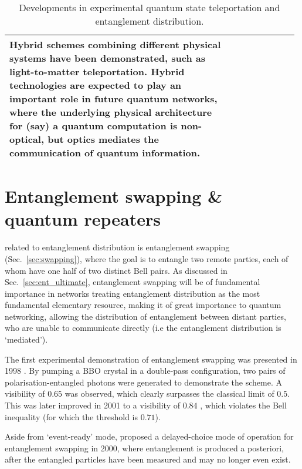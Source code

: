 \begin{table*}[!htbp]
\begin{tabular}{|p{0.755\linewidth}|p{0.22\linewidth}|}
	\hline
Hybrid schemes combining different physical systems have been demonstrated, such as light-to-matter teleportation. Hybrid technologies are expected to play an important role in future quantum networks, where the underlying physical architecture for (say) a quantum computation is non-optical, but optics mediates the communication of quantum information. & \cite{bib:Nat_443_557, bib:Nat_Comm_4_2744} \\
	\hline
\end{tabular}
\captionspacetab \caption{Developments in experimental quantum state teleportation and entanglement distribution.} \label{tab:state_tomo}
\end{table*}

%
%

\section{Entanglement swapping \& quantum repeaters}  

 related to entanglement distribution is entanglement swapping (Sec.~\ref{sec:swapping}), where the goal is to entangle two remote parties, each of whom have one half of two distinct Bell pairs. As discussed in Sec.~\ref{sec:ent_ultimate}, entanglement swapping will be of fundamental importance in networks treating entanglement distribution as the most fundamental elementary resource, making it of great importance to quantum networking, allowing the distribution of entanglement between distant parties, who are unable to communicate directly (i.e the entanglement distribution is `mediated').

The first experimental demonstration of entanglement swapping was presented in 1998 \cite{bib:PRL_80_3891}. By pumping a BBO crystal in a double-pass configuration, two pairs of polarisation-entangled photons were generated to demonstrate the scheme. A visibility of \mbox{$0.65$} was observed, which clearly surpasses the classical limit of \mbox{$0.5$}. This was later improved in 2001 to a visibility of \mbox{$0.84$} \cite{bib:PRL_86_4435}, which violates the Bell inequality (for which the threshold is $0.71$). 

Aside from `event-ready' mode, \cite{bib:JMO_47_2} proposed a delayed-choice mode of operation for entanglement swapping in 2000, where entanglement is produced a posteriori, after the entangled particles have been measured and may no longer even exist.

